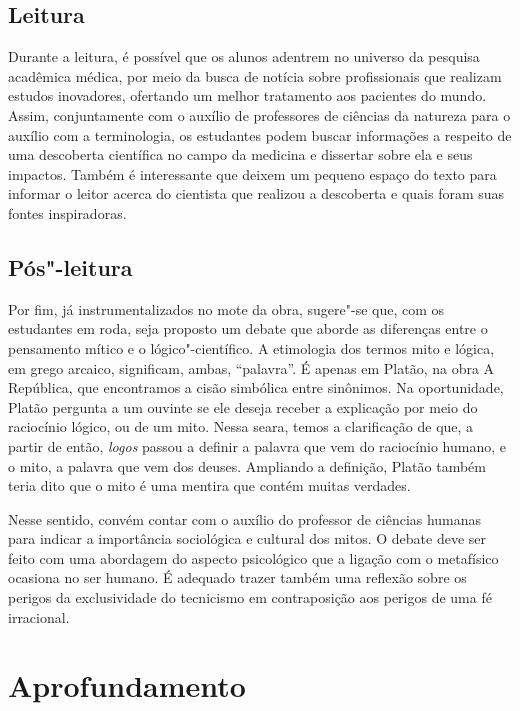 \documentclass[12pt]{extarticle}
\begin{document}
\subsection{Leitura}

Durante a leitura, é possível que os alunos adentrem no
universo da pesquisa acadêmica médica, por meio da busca de notícia sobre profissionais que realizam estudos inovadores, ofertando um melhor
tratamento aos pacientes do mundo. Assim, conjuntamente com o auxílio de
professores de ciências da natureza para o auxílio com a terminologia,
os estudantes podem buscar informações a respeito de uma descoberta
científica no campo da medicina e dissertar sobre ela e seus impactos. Também é interessante que deixem um pequeno espaço do texto para informar o leitor acerca do cientista que realizou a descoberta e quais foram suas fontes
inspiradoras.

\subsection{Pós"-leitura}

Por fim, já instrumentalizados no mote da obra, sugere"-se
que, com os estudantes em roda, seja proposto um debate que aborde as
diferenças entre o pensamento mítico e o lógico"-científico. A etimologia
dos termos mito e lógica, em grego arcaico, significam, ambas,
``palavra''. É apenas em Platão, na obra A República, que encontramos a
cisão simbólica entre sinônimos. Na oportunidade, Platão pergunta a um
ouvinte se ele deseja receber a explicação por meio do raciocínio
lógico, ou de um mito. Nessa seara, temos a clarificação de que, a
partir de então, \emph{logos} passou a definir a palavra que vem do raciocínio
humano, e o mito, a palavra que vem dos deuses. Ampliando a definição,
Platão também teria dito que o mito é uma mentira que contém muitas
verdades.

Nesse sentido, convém contar com o auxílio do professor de ciências
humanas para indicar a importância sociológica e cultural dos mitos. O debate deve ser feito com uma abordagem do aspecto psicológico que a ligação com o metafísico ocasiona no ser humano. É adequado trazer também uma reflexão sobre os perigos
da exclusividade do tecnicismo em contraposição aos perigos de uma fé irracional.

\section{Aprofundamento}
\end{document}
